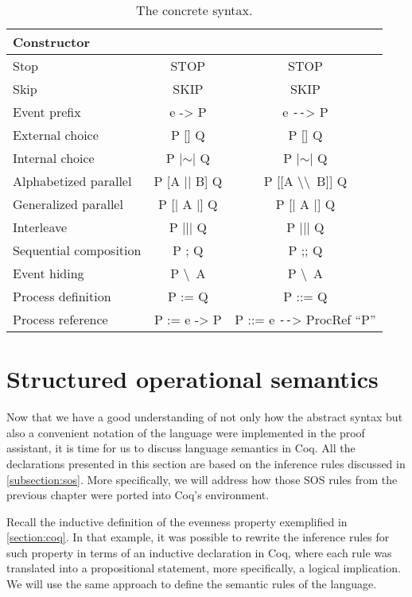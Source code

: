 \begin{table}[htb]
	\begin{center}
		\caption[The \CSPcoq{} concrete syntax]{The \CSPcoq{} concrete syntax.}
		\label{tab:cspm-csp_coq}
		\begin{tabular}{ |l|c|c| }
			\hline
			Constructor & \CSPM{} & \CSPcoq{} \\
			\hline
			Stop & STOP & STOP \\ [0.5ex]
			Skip & SKIP & SKIP \\ [0.5ex]
			Event prefix & e -> P & e \texttt{-{}-}> P \\  [0.5ex]
			External choice & P [] Q & P [] Q \\  [0.5ex]
			Internal choice & P |$ \sim $| Q & P |$ \sim $| Q \\ [0.5ex]
			Alphabetized parallel & P [A || B] Q & P [[A \textbackslash\textbackslash \ B]] Q \\ [0.5ex]
			Generalized parallel & P [| A |] Q & P [| A |] Q \\ [0.5ex]
			Interleave & P ||| Q & P ||| Q \\ [0.5ex]
			Sequential composition & P ; Q & P ;; Q \\ [0.5ex]
			Event hiding & P \textbackslash \ A & P \textbackslash \ A \\ [0.5ex]
			Process definition & P := Q & P ::= Q \\ [0.5ex]
			Process reference & P := e -> P & P ::= e \texttt{-{}-}> ProcRef ``P'' \\ [0.5ex]
			\hline
		\end{tabular}
	\end{center}
\end{table}

\section{Structured operational semantics}
\label{section:sos}

Now that we have a good understanding of not only how the abstract syntax but also a convenient notation of the \CSPcoq{} language were implemented in the proof assistant, it is time for us to discuss language semantics in Coq. All the declarations presented in this section are based on the inference rules discussed in \autoref{subsection:sos}. More specifically, we will address how those SOS rules from the previous chapter were ported into Coq's environment.

Recall the inductive definition of the evenness property exemplified in \autoref{section:coq}. In that example, it was possible to rewrite the inference rules for such property in terms of an inductive declaration in Coq, where each rule was translated into a propositional statement, more specifically, a logical implication. We will use the same approach to define the semantic rules of the \CSPcoq{} language.

